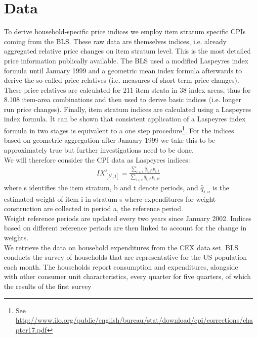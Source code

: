 \documentclass{article}
\begin{document}
\section{Data}\label{data}
To derive household-specific price indices we employ item stratum specific CPIs coming from the BLS. These raw data are themselves indices, i.e. already aggregated relative price changes on item stratum level. This is the most detailed price information publically available. The BLS used a modified Laspeyres index formula until January 1999 and a geometric mean index formula afterwards to derive the so-called price relatives (i.e. measures of short term price changes). These price relatives are calculated for 211 item strata in 38 index areas, thus for 8.108 item-area combinations and then used to derive basic indices (i.e. longer run price changes). Finally, item stratum indices are calculated using a Laspeyres index formula. It can be shown that consistent application of a Laspeyres index formula in two stages is equivalent to a one step procedure\footnote{ See \url{http://www.ilo.org/public/english/bureau/stat/download/cpi/corrections/chapter17.pdf}}. For the indices based on geometric aggregation after January 1999 we take this to be approximately true but further investigations need to be done. \\
We will therefore consider the CPI data as Laspeyres indices: 
\begin{align}\label{stratum_ix}
   IX^s_{[b^s,t]}= \frac{\sum_{i\in s} \hat{q}_{i,b^s}p_{i,t}}{\sum_{i\in s} \hat{q}_{i,b^s}p_{i,b^s}}
\end{align}
where s identifies the item stratum, b and t denote periods, and $\hat{q}_{i,a}$ is the estimated weight of item i in stratum s where expenditures for weight construction are collected in period a, the reference period.\\
Weight reference periods are updated every two years since January 2002. Indices based on different reference periods are then linked to account for the change in weights. 
\\
We retrieve the data on household expenditures from the CEX data set. BLS conducts the survey of households that are representative for the US population each month. The households report consumption and expenditures, alongside with other consumer unit characteristics, every quarter for five quarters, of which the results of the first survey 
\end{document}
